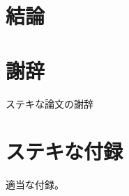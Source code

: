 \documentclass[uplatex]{sumiilab-paper}
\theoremstyle{mystyle}
\numberwithin{definition}{chapter} %
\begin{document}


\chapter{結論}


\backmatter%
\chapter{謝辞}

ステキな論文の謝辞




\appendix%
\chapter{ステキな付録}
適当な付録。
\end{document}
